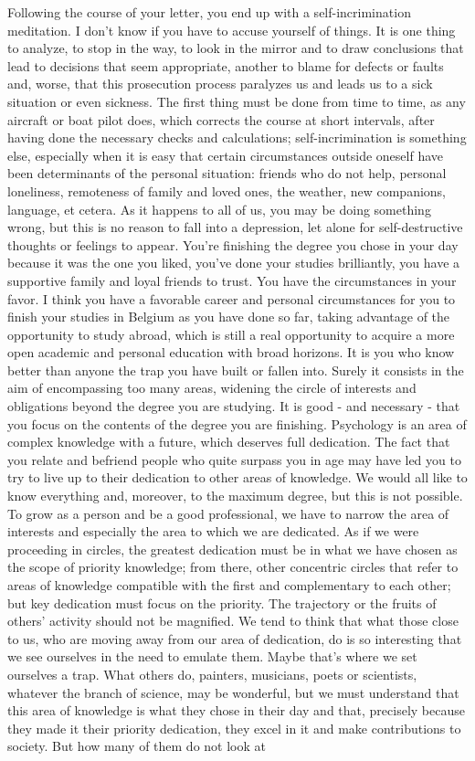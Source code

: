 \documentclass[]{book}
\begin{document}
Following the course of your letter, you end up with a self-incrimination meditation. I don't know if you have to accuse yourself of things. It is one thing to analyze, to stop in the way, to look in the mirror and to draw conclusions that lead to decisions that seem appropriate, another to blame for defects or faults and, worse, that this prosecution process paralyzes us and leads us to a sick situation or even sickness. The first thing must be done from time to time, as any aircraft or boat pilot does, which corrects the course at short intervals, after having done the necessary checks and calculations; self-incrimination is something else, especially when it is easy that certain circumstances outside oneself have been determinants of the personal situation: friends who do not help, personal loneliness, remoteness of family and loved ones, the weather, new companions, language, et cetera. As it happens to all of us, you may be doing something wrong, but this is no reason to fall into a depression, let alone for self-destructive thoughts or feelings to appear. You're finishing the degree you chose in your day because it was the one you liked, you've done your studies brilliantly, you have a supportive family and loyal friends to trust. You have the circumstances in your favor. I think you have a favorable career and personal circumstances for you to finish your studies in Belgium as you have done so far, taking advantage of the opportunity to study abroad, which is still a real opportunity to acquire a more open academic and personal education with broad horizons. It is you who know better than anyone the trap you have built or fallen into. Surely it consists in the aim of encompassing too many areas, widening the circle of interests and obligations beyond the degree you are studying. It is good - and necessary - that you focus on the contents of the degree you are finishing. Psychology is an area of complex knowledge with a future, which deserves full dedication. The fact that you relate and befriend people who quite surpass you in age may have led you to try to live up to their dedication to other areas of knowledge. We would all like to know everything and, moreover, to the maximum degree, but this is not possible. To grow as a person and be a good professional, we have to narrow the area of interests and especially the area to which we are dedicated. As if we were proceeding in circles, the greatest dedication must be in what we have chosen as the scope of priority knowledge; from there, other concentric circles that refer to areas of knowledge compatible with the first and complementary to each other; but key dedication must focus on the priority. The trajectory or the fruits of others' activity should not be magnified. We tend to think that what those close to us, who are moving away from our area of dedication, do is so interesting that we see ourselves in the need to emulate them. Maybe that's where we set ourselves a trap. What others do, painters, musicians, poets or scientists, whatever the branch of science, may be wonderful, but we must understand that this area of knowledge is what they chose in their day and that, precisely because they made it their priority dedication, they excel in it and make contributions to society. But how many of them do not look at 
\end{document}

